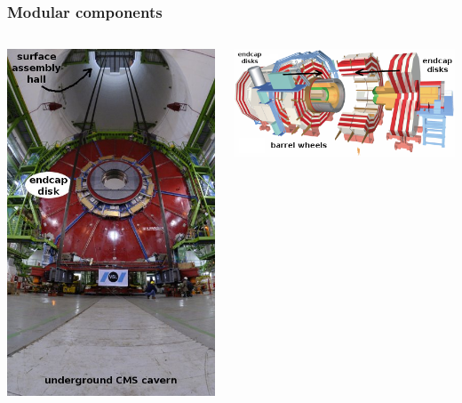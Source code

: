 \documentclass[compress]{beamer}
\begin{document}
\begin{frame}
\frametitle{Modular components}
\begin{columns}
\includegraphics[width=\linewidth]{lowering2.jpg}

\begin{center}
\includegraphics[width=0.8\linewidth]{modularity.png}
\end{center}


\end{columns}
\end{frame}
\end{document}
